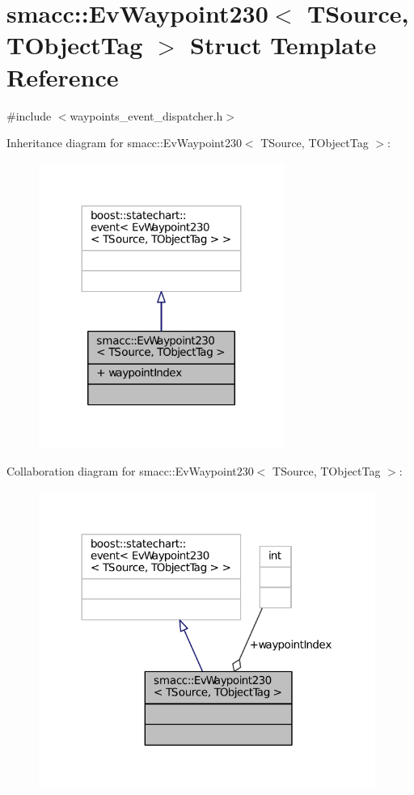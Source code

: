 \hypertarget{structsmacc_1_1EvWaypoint230}{}\section{smacc\+:\+:Ev\+Waypoint230$<$ T\+Source, T\+Object\+Tag $>$ Struct Template Reference}
\label{structsmacc_1_1EvWaypoint230}


{\ttfamily \#include $<$waypoints\+\_\+event\+\_\+dispatcher.\+h$>$}



Inheritance diagram for smacc\+:\+:Ev\+Waypoint230$<$ T\+Source, T\+Object\+Tag $>$\+:
\nopagebreak
\begin{figure}[H]
\begin{center}
\leavevmode
\includegraphics[width=227pt]{structsmacc_1_1EvWaypoint230__inherit__graph}
\end{center}
\end{figure}


Collaboration diagram for smacc\+:\+:Ev\+Waypoint230$<$ T\+Source, T\+Object\+Tag $>$\+:
\nopagebreak
\begin{figure}[H]
\begin{center}
\leavevmode
\includegraphics[width=312pt]{structsmacc_1_1EvWaypoint230__coll__graph}
\end{center}
\end{figure}
